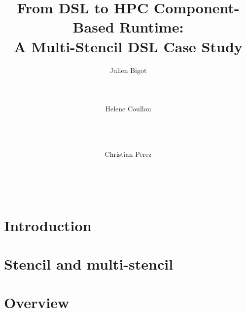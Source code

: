 \documentclass{acm_proc_article-sp}
\begin{document}
\title{From DSL to HPC Component-Based Runtime:\\ A Multi-Stencil DSL Case Study}

\author{
\alignauthor
Julien Bigot\\
       \\
       \\
       \\ %
\alignauthor
Helene Coullon\\
       \\
       \\
       \\
\and
\alignauthor
Christian Perez\\
       \\
       \\
       \\
}

\maketitle

\begin{abstract}

\end{abstract}


\section{Introduction}
\label{sect:intro}

\section{Stencil and multi-stencil}
\label{sect:concept}

\section{Overview}
\label{sect:mscac}

\end{document}
